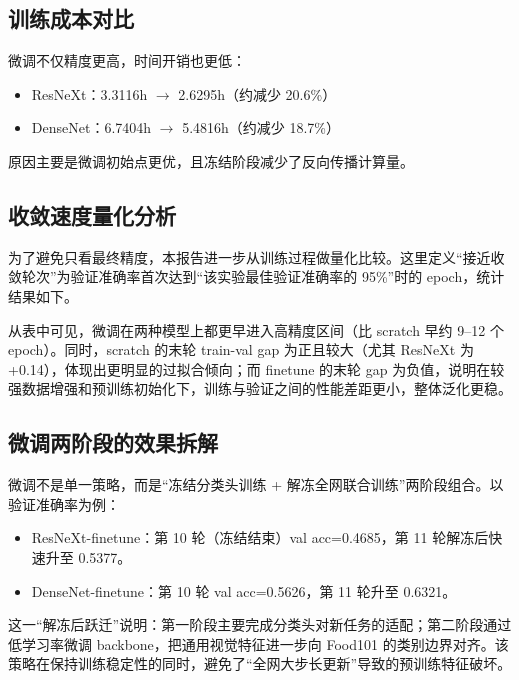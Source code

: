 \documentclass[a4paper,10pt,twocolumn]{article}
\begin{document}
\subsection{训练成本对比}
微调不仅精度更高，时间开销也更低：
\begin{itemize}
  \item ResNeXt：3.3116h $\rightarrow$ 2.6295h（约减少 20.6\%）
  \item DenseNet：6.7404h $\rightarrow$ 5.4816h（约减少 18.7\%）
\end{itemize}
原因主要是微调初始点更优，且冻结阶段减少了反向传播计算量。

\subsection{收敛速度量化分析}
为了避免只看最终精度，本报告进一步从训练过程做量化比较。这里定义“接近收敛轮次”为验证准确率首次达到“该实验最佳验证准确率的 95\%”时的 epoch，统计结果如下。

\begin{table}[H]
\centering
\scriptsize
\caption{收敛速度与最佳轮次对比（来自 history.csv）}
\end{table}

从表中可见，微调在两种模型上都更早进入高精度区间（比 scratch 早约 9--12 个 epoch）。同时，scratch 的末轮 train-val gap 为正且较大（尤其 ResNeXt 为 +0.14），体现出更明显的过拟合倾向；而 finetune 的末轮 gap 为负值，说明在较强数据增强和预训练初始化下，训练与验证之间的性能差距更小，整体泛化更稳。

\subsection{微调两阶段的效果拆解}
微调不是单一策略，而是“冻结分类头训练 + 解冻全网联合训练”两阶段组合。以验证准确率为例：
\begin{itemize}
  \item ResNeXt-finetune：第 10 轮（冻结结束）val acc=0.4685，第 11 轮解冻后快速升至 0.5377。
  \item DenseNet-finetune：第 10 轮 val acc=0.5626，第 11 轮升至 0.6321。
\end{itemize}
这一“解冻后跃迁”说明：第一阶段主要完成分类头对新任务的适配；第二阶段通过低学习率微调 backbone，把通用视觉特征进一步向 Food101 的类别边界对齐。该策略在保持训练稳定性的同时，避免了“全网大步长更新”导致的预训练特征破坏。
\end{document}
